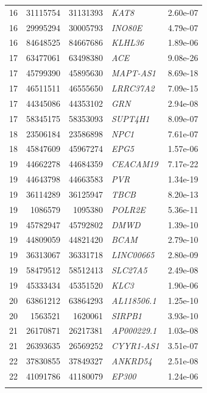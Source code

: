 \begin{longtable}{rrrlr}
   16 & 31115754 & 31131393 & \textit{KAT8} & 2.60e-07 \\ 
   16 & 29995294 & 30005793 & \textit{INO80E} & 4.79e-07 \\ 
   16 & 84648525 & 84667686 & \textit{KLHL36} & 1.89e-06 \\ 
   17 & 63477061 & 63498380 & \textit{ACE} & 9.08e-26 \\ 
   17 & 45799390 & 45895630 & \textit{MAPT-AS1} & 8.69e-18 \\ 
   17 & 46511511 & 46555650 & \textit{LRRC37A2} & 7.09e-15 \\ 
   17 & 44345086 & 44353102 & \textit{GRN} & 2.94e-08 \\ 
   17 & 58345175 & 58353093 & \textit{SUPT4H1} & 8.09e-07 \\ 
   18 & 23506184 & 23586898 & \textit{NPC1} & 7.61e-07 \\ 
   18 & 45847609 & 45967274 & \textit{EPG5} & 1.57e-06 \\ 
   19 & 44662278 & 44684359 & \textit{CEACAM19} & 7.17e-22 \\ 
   19 & 44643798 & 44663583 & \textit{PVR} & 1.34e-19 \\ 
   19 & 36114289 & 36125947 & \textit{TBCB} & 8.20e-13 \\ 
   19 & 1086579 & 1095380 & \textit{POLR2E} & 5.36e-11 \\ 
   19 & 45782947 & 45792802 & \textit{DMWD} & 1.39e-10 \\ 
   19 & 44809059 & 44821420 & \textit{BCAM} & 2.79e-10 \\ 
   19 & 36313067 & 36331718 & \textit{LINC00665} & 2.80e-09 \\ 
   19 & 58479512 & 58512413 & \textit{SLC27A5} & 2.49e-08 \\ 
   19 & 45333434 & 45351520 & \textit{KLC3} & 1.90e-06 \\ 
   20 & 63861212 & 63864293 & \textit{AL118506.1} & 1.25e-10 \\ 
   20 & 1563521 & 1620061 & \textit{SIRPB1} & 3.93e-10 \\ 
   21 & 26170871 & 26217381 & \textit{AP000229.1} & 1.03e-08 \\ 
   21 & 26393635 & 26569252 & \textit{CYYR1-AS1} & 3.51e-07 \\ 
   22 & 37830855 & 37849327 & \textit{ANKRD54} & 2.51e-08 \\ 
   22 & 41091786 & 41180079 & \textit{EP300} & 1.24e-06 \\ 
   \bottomrule
\label{tab:cis/trans-TWAS_riskgenes}
\end{longtable}
\pagebreak

